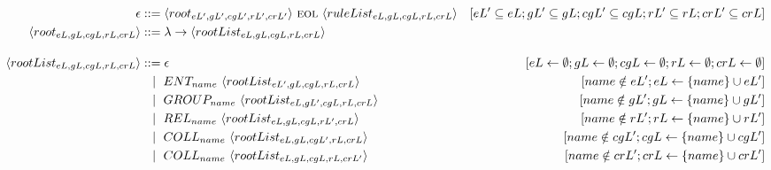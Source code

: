 \begin{frame}{}
    \centering
    \begin{adjustbox}{max width=\linewidth,max height=.95\textheight,valign=c}
        \parbox{\linewidth}{\begin{align*}
                \epsilon                                    & ::= \langle root_{eL',gL',cgL',rL',crL'} \rangle ~\textsc{eol}~ \langle ruleList_{eL,gL,cgL,rL,crL} \rangle  & [eL' \subseteq eL; gL' \subseteq gL; cgL' \subseteq cgL; rL' \subseteq rL; crL' \subseteq crL]         \\
                \langle root_{eL,gL,cgL,rL,crL} \rangle     & ::= \lambda \to \langle rootList_{eL,gL,cgL,rL,crL} \rangle                                                                                                                                                           \\[1em]
                \langle rootList_{eL,gL,cgL,rL,crL} \rangle & ::= \epsilon                                                                                                 & [eL \gets \emptyset; gL \gets \emptyset; cgL \gets \emptyset; rL \gets \emptyset; crL \gets \emptyset] \\
                                                            & ~~ \mid ~ ENT_{name}  ~ \langle rootList_{eL',gL,cgL,rL,crL} \rangle                                         & [name \notin eL'; eL \gets \{name\} \cup eL']                                                          \\
                                                            & ~~ \mid ~ GROUP_{name} ~ \langle rootList_{eL,gL',cgL,rL,crL} \rangle                                        & [name \notin gL'; gL \gets \{name\} \cup gL']                                                          \\
                                                            & ~~ \mid ~ REL_{name}  ~ \langle rootList_{eL,gL,cgL,rL',crL} \rangle                                         & [name \notin rL'; rL \gets \{name\} \cup rL']                                                          \\
                                                            & ~~ \mid ~ COLL_{name} ~ \langle rootList_{eL,gL,cgL',rL,crL} \rangle                                         & [name \notin cgL'; cgL \gets \{name\} \cup cgL']                                                       \\
                                                            & ~~ \mid ~ COLL_{name} ~ \langle rootList_{eL,gL,cgL,rL,crL'} \rangle                                         & [name \notin crL'; crL \gets \{name\} \cup crL']                                                       \\[1em]

\end{align*}}
\end{adjustbox}
\end{frame}
